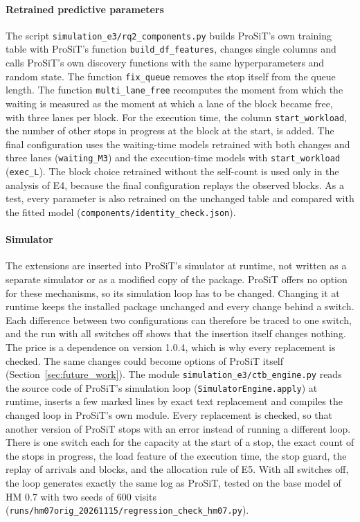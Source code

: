 \paragraph{Retrained predictive parameters} The script
\nolinkurl{simulation_e3/rq2_components.py} builds ProSiT's own training table with
ProSiT's function \texttt{build\_df\_features}, changes single columns and calls
ProSiT's own discovery functions with the same hyperparameters and random state.
The function \texttt{fix\_queue} removes the stop itself from the queue length. The
function \texttt{multi\_lane\_free} recomputes the moment from which the waiting is
measured as the moment at which a lane of the block became free, with three lanes per
block. For the execution time, the column \texttt{start\_workload}, the number of
other stops in progress at the block at the start, is added. The final configuration
uses the waiting-time models retrained with both changes and three lanes
(\texttt{waiting\_M3}) and the execution-time models with \texttt{start\_workload}
(\texttt{exec\_L}). The block choice retrained without the self-count is used only in
the analysis of E4, because the final configuration replays the observed blocks. As a
test, every parameter is also retrained on the unchanged table and compared with the
fitted model (\nolinkurl{components/identity_check.json}).

\paragraph{Simulator} The extensions are inserted into ProSiT's simulator at runtime,
not written as a separate simulator or as a modified copy of the package. ProSiT
offers no option for these mechanisms, so its simulation loop has to be changed.
Changing it at runtime keeps the installed package unchanged and every change behind
a switch. Each difference between two configurations can therefore be traced to one
switch, and the run with all switches off shows that the insertion itself changes
nothing. The price is a dependence on version 1.0.4, which is why every replacement is
checked. The same changes could become options of ProSiT itself
(Section~\ref{sec:future_work}). The module \nolinkurl{simulation_e3/ctb_engine.py} reads the
source code of ProSiT's simulation loop (\texttt{SimulatorEngine.apply}) at runtime,
inserts a few marked lines by exact text replacement and compiles the changed loop
in ProSiT's own module. Every replacement is checked, so that another version of
ProSiT stops with an error instead of running a different loop. There is one
switch each for the capacity at the start of a stop, the exact count of the stops in
progress, the load feature of the execution time, the stop guard, the replay of
arrivals and blocks, and the allocation rule of E5. With all switches off, the loop
generates exactly the same log as ProSiT, tested on the base model of HM 0.7 with two
seeds of 600 visits (\nolinkurl{runs/hm07orig_20261115/regression_check_hm07.py}).

